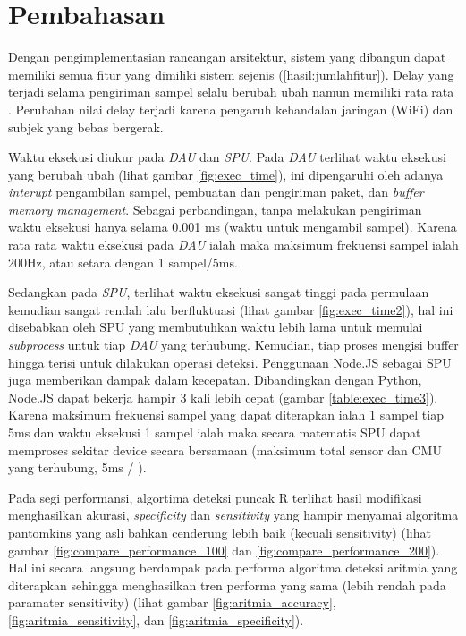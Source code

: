 \section{Pembahasan}\label{bab4:pembahasan}
Dengan pengimplementasian rancangan arsitektur, sistem yang dibangun dapat memiliki semua fitur yang dimiliki sistem sejenis (\ref{hasil:jumlahfitur}). Delay yang terjadi selama pengiriman sampel selalu berubah ubah namun memiliki rata rata \delay. Perubahan nilai delay terjadi karena pengaruh kehandalan jaringan (WiFi) dan subjek yang bebas bergerak. 

Waktu eksekusi diukur pada \textit{DAU} dan \textit{SPU}. Pada \textit{DAU} terlihat waktu eksekusi yang berubah ubah (lihat gambar \ref{fig:exec_time}), ini dipengaruhi oleh adanya \textit{interupt} pengambilan sampel, pembuatan dan pengiriman paket, dan \textit{buffer memory management}. Sebagai perbandingan, tanpa melakukan pengiriman waktu eksekusi hanya selama 0.001 ms (waktu untuk mengambil sampel). Karena rata rata waktu eksekusi pada \textit{DAU} ialah \exec maka maksimum frekuensi sampel ialah 200Hz, atau setara dengan 1 sampel/5ms. 

Sedangkan pada \textit{SPU}, terlihat waktu eksekusi sangat tinggi pada permulaan kemudian sangat rendah lalu berfluktuasi (lihat gambar \ref{fig:exec_time2}), hal ini disebabkan oleh SPU yang membutuhkan waktu lebih lama untuk memulai \textit{subprocess} untuk tiap \textit{DAU} yang terhubung. Kemudian, tiap proses mengisi buffer hingga terisi untuk dilakukan operasi deteksi. Penggunaan Node.JS sebagai SPU juga memberikan dampak dalam kecepatan. Dibandingkan dengan Python, Node.JS dapat bekerja hampir 3 kali lebih cepat (gambar \ref{table:exec_time3}). Karena maksimum frekuensi sampel yang dapat diterapkan ialah 1 sampel tiap 5ms dan waktu eksekusi 1 sampel ialah \execs maka secara matematis SPU dapat memproses sekitar \sensor device secara bersamaan (maksimum total sensor dan CMU yang terhubung, 5ms / \execs).

Pada segi performansi, algortima deteksi puncak R terlihat hasil modifikasi menghasilkan akurasi, \textit{specificity} dan \textit{sensitivity} yang hampir menyamai algoritma pantomkins yang asli bahkan cenderung lebih baik (kecuali sensitivity) (lihat gambar \ref{fig:compare_performance_100} dan \ref{fig:compare_performance_200}). Hal ini secara langsung berdampak pada performa algoritma deteksi aritmia yang diterapkan sehingga menghasilkan tren performa yang sama (lebih rendah pada paramater sensitivity) (lihat gambar \ref{fig:aritmia_accuracy}, \ref{fig:aritmia_sensitivity}, dan \ref{fig:aritmia_specificity}).
